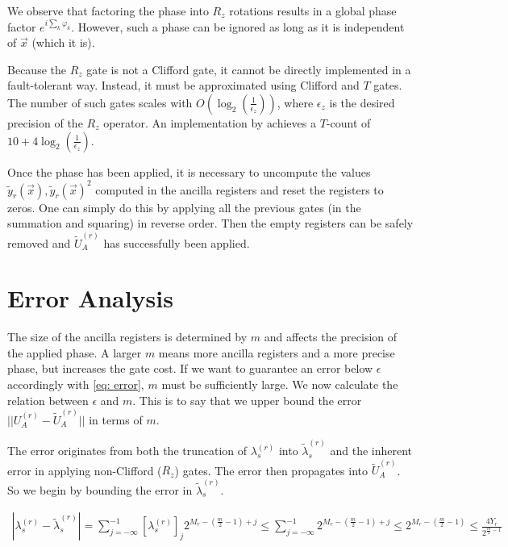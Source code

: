 We observe that factoring the phase into $R_z$ rotations results in a global phase factor $e^{i\sum_k \varphi_k}$. However, such a phase can be ignored as long as it is independent of $\vec{x}$ (which it is).

Because the $R_z$ gate is not a Clifford gate, it cannot be directly implemented in a fault-tolerant way. Instead, it must be approximated using Clifford and $T$ gates. The number of such gates scales with $O(\log_2(\frac{1}{\epsilon_z}))$, where $\epsilon_z$ is the desired precision of the $R_z$ operator. An implementation by \cite{Rz} achieves a $T$-count of $10 + 4\log_2(\frac{1}{\epsilon_z})$. 

Once the phase has been applied, it is necessary to uncompute the values $\tilde{y}_r(\vec{x}), \tilde{y}_r(\vec{x})^2$ computed in the ancilla registers and reset the registers to zeros. One can simply do this by applying all the previous gates (in the summation and squaring) in reverse order. Then the empty registers can be safely removed and $\tilde{U}_A^{(r)}$ has successfully been applied.

\section{Error Analysis}

The size of the ancilla registers is determined by $m$ and affects the precision of the applied phase. A larger $m$ means more ancilla registers and a more precise phase, but increases the gate cost. If we want to guarantee an error below $\epsilon$ accordingly with \eqref{eq: error}, $m$ must be sufficiently large. We now calculate the relation between $\epsilon$ and $m$. This is to say that we upper bound the error $||U_A^{(r)} - \tilde{U}_A^{(r)}||$ in terms of $m$.

The error originates from both the truncation of $\lambda^{(r)}_s$ into $\tilde{\lambda}^{(r)}_s$ and the inherent error in applying non-Clifford ($R_z$) gates. The error then propagates into $\tilde{U}_A^{(r)}$. So we begin by bounding the error in $\tilde{\lambda}^{(r)}_s$.

\begin{equation}
    \begin{split}
        |\lambda^{(r)}_s - \tilde{\lambda}^{(r)}_s| = \sum_{j = -\infty}^{-1} [\lambda^{(r)}_s]_j2^{M_r - (\frac{m}{2} - 1) + j} \leq \sum_{j = -\infty}^{-1} 2^{M_r - (\frac{m}{2} - 1) + j} \leq 2^{M_r - (\frac{m}{2} - 1)} \leq \frac{4Y_r}{2^{\frac{m}{2} - 1}}
    \end{split}
\end{equation}


